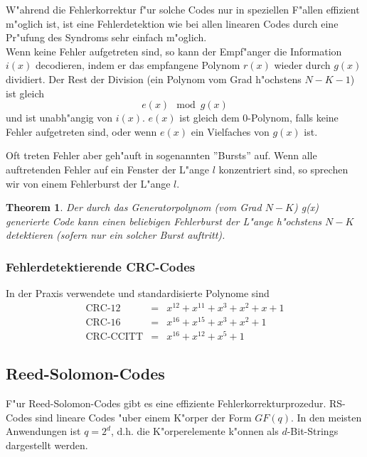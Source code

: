 \documentclass[german, 10pt, a4paper, twocolumn]{scrartcl}
\newtheorem{theorem}{Theorem}
\begin{document}
W"ahrend die Fehlerkorrektur f"ur solche Codes nur in speziellen F"allen effizient m"oglich ist, ist eine Fehlerdetektion wie bei allen linearen Codes durch eine Pr"ufung des Syndroms sehr einfach m"oglich.\\
Wenn keine Fehler aufgetreten sind, so kann der Empf"anger die Information $i(x)$ decodieren, indem er das empfangene Polynom $r(x)$ wieder durch $g(x)$ dividiert. Der Rest der Division (ein Polynom vom Grad h"ochstens $N-K-1$) ist gleich
\begin{displaymath}
	e(x) \mod g(x)
\end{displaymath}
und ist unabh"angig von $i(x)$. $e(x)$ ist gleich dem 0-Polynom, falls keine Fehler aufgetreten sind, oder wenn $e(x)$ ein Vielfaches von $g(x)$ ist.

Oft treten Fehler aber geh"auft in sogenannten ''Bursts'' auf. Wenn alle auftretenden Fehler auf ein Fenster der L"ange $l$ konzentriert sind, so sprechen wir von einem Fehlerburst der L"ange $l$.

\begin{theorem}
	Der durch das Generatorpolynom (vom Grad $N-K$) g(x) generierte Code kann einen beliebigen Fehlerburst der L"ange h"ochstens $N-K$ detektieren (sofern nur ein solcher Burst auftritt).
\end{theorem}

\subsubsection{Fehlerdetektierende CRC-Codes}

In der Praxis verwendete und standardisierte Polynome sind
\begin{eqnarray}
	\mbox{CRC-12} &		=&	x^{12}+x^{11}+x^3+x^2+x+1 \nonumber \\
	\mbox{CRC-16} &		=&	x^{16}+x^{15}+x^3+x^2+1 \nonumber \\
	\mbox{CRC-CCITT} &	=&	x^{16}+x^{12}+x^5+1 \nonumber
\end{eqnarray}

\subsection{Reed-Solomon-Codes}

F"ur Reed-Solomon-Codes gibt es eine effiziente Fehlerkorrekturprozedur. RS-Codes sind lineare Codes "uber einem K"orper der Form $GF(q)$. In den meisten Anwendungen ist $q=2^d$, d.h. die K"orperelemente k"onnen als $d$-Bit-Strings dargestellt werden.
\end{document}
